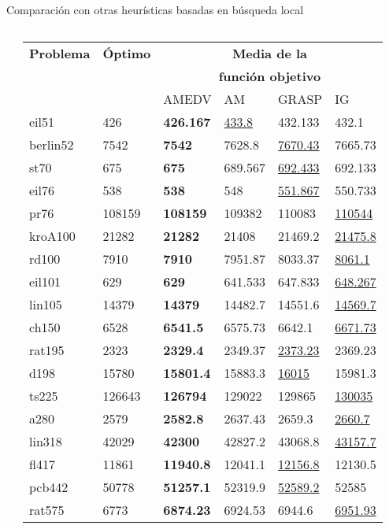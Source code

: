 		\begin{frame}{\fontsize{14}{8}\selectfont Comparación con otras heurísticas basadas en búsqueda local}
			\fontsize{6}{8}\selectfont					
			\kern -0.25cm
			\begin{columns}[c]
				\begin{table}[H]
					\label{table:ls-media}
					\centering
					\begin{tabular}{llllll}
						\toprule
						\textbf{Problema} & \textbf{Óptimo} & \multicolumn{4}{c}{\color{red}\textbf{Media de la}} \\
						&  & \multicolumn{4}{c}{\color{red}\textbf{función objetivo}} \\
						\midrule
						& & AMEDV & AM & GRASP & IG \\
						\cmidrule{3-6}
						eil51    & 426    & \textbf{426.167} & \underline{433.8} & 432.133 & 432.1 \\
						berlin52 & 7542   & \textbf{7542} & 7628.8 & \underline{7670.43} & 7665.73 \\
						st70     & 675    & \textbf{675} & 689.567 & \underline{692.433} & 692.133 \\
						eil76    & 538    & \textbf{538} & 548 & \underline{551.867} & 550.733 \\
						pr76     & 108159 & \textbf{108159} & 109382 & 110083 & \underline{110544} \\
						kroA100  & 21282  & \textbf{21282} & 21408 & 21469.2 & \underline{21475.8} \\
						rd100    & 7910   & \textbf{7910} & 7951.87 & 8033.37 & \underline{8061.1} \\
						eil101   & 629    & \textbf{629} & 641.533 & 647.833 & \underline{648.267} \\
						lin105   & 14379  & \textbf{14379} & 14482.7 & 14551.6 & \underline{14569.7} \\
						ch150    & 6528   & \textbf{6541.5} & 6575.73 & 6642.1 & \underline{6671.73} \\
						rat195   & 2323   & \textbf{2329.4} & 2349.37 & \underline{2373.23} & 2369.23 \\
						d198     & 15780  & \textbf{15801.4} & 15883.3 & \underline{16015} & 15981.3 \\
						ts225    & 126643 & \textbf{126794} & 129022 & 129865 & \underline{130035} \\
						a280     & 2579   & \textbf{2582.8} & 2637.43 & 2659.3 & \underline{2660.7} \\
						lin318   & 42029  & \textbf{42300} & 42827.2 & 43068.8 & \underline{43157.7} \\
						fl417    & 11861  & \textbf{11940.8} & 12041.1 & \underline{12156.8} & 12130.5 \\
						pcb442   & 50778  & \textbf{51257.1} & 52319.9 & \underline{52589.2} & 52585 \\
						rat575   & 6773   & \textbf{6874.23} & 6924.53 & 6944.6 & \underline{6951.93} \\
						\bottomrule
					\end{tabular}
				\end{table}


\end{columns}
\end{frame}
